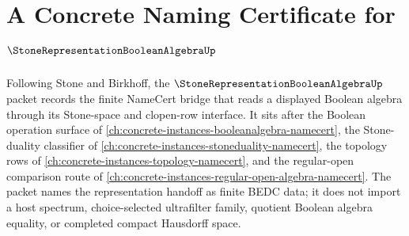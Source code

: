 \chapter{A Concrete Naming Certificate for $\StoneRepresentationBooleanAlgebraUp$}
\label{ch:concrete-instances-stone-representation-boolean-algebra-namecert}

Following Stone and Birkhoff, the $\StoneRepresentationBooleanAlgebraUp$ packet records the finite NameCert bridge that reads a displayed Boolean algebra through its Stone-space and clopen-row interface. It sits after the Boolean operation surface of \autoref{ch:concrete-instances-booleanalgebra-namecert}, the Stone-duality classifier of \autoref{ch:concrete-instances-stoneduality-namecert}, the topology rows of \autoref{ch:concrete-instances-topology-namecert}, and the regular-open comparison route of \autoref{ch:concrete-instances-regular-open-algebra-namecert}. The packet names the representation handoff as finite BEDC data; it does not import a host spectrum, choice-selected ultrafilter family, quotient Boolean algebra equality, or completed compact Hausdorff space.

